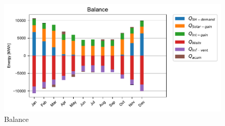 \documentclass[english]{SPFShortReportIndex}
\begin{document}
\begin{figure}[!ht]
\begin{center}
\includegraphics[width=1\textwidth]{BuildingBalance.pdf}
\caption{Balance}
\label{BuildingBalance.pdf}
\end{center}
\end{figure}
\end{document}
